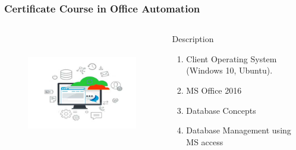 \begin{frame}
	\frametitle{Certificate Course in Office Automation}
		\begin{columns}
		
		
		\begin{figure}
			\includegraphics[width=200pt,height=150pt]{figures/course_oa.jpg}
		\end{figure}
		
		
		\begin{block}{Description}
			
			\begin{enumerate}
				\item Client Operating System (Windows 10, Ubuntu). 
				\item MS Office 2016
				\item Database Concepts
				\item Database Management using MS access
			\end{enumerate}
			
		\end{block}
		
	\end{columns}
\end{frame}
